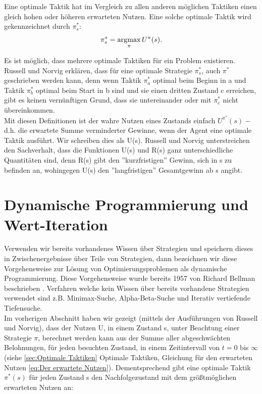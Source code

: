 Eine optimale Taktik hat im Vergleich zu allen anderen möglichen Taktiken einen gleich hohen oder höheren erwarteten Nutzen. Eine solche optimale Taktik wird gekennzeichnet durch $\pi^*_s$: \\ 

\begin{equation}
\pi^*_s = \operatorname*{arg\!\max}_\pi U^\pi(s).
\end{equation}

Es ist möglich, dass mehrere optimale Taktiken für ein Problem existieren. Russell und Norvig erklären, dass für eine optimale Strategie $\pi^*_s$, auch $\pi^*$ geschrieben werden kann, denn wenn Taktik $\pi^*_a$ optimal beim Beginn in a und Taktik $\pi^*_b$ optimal beim Start in b sind und sie einen dritten Zustand c erreichen, gibt es keinen vernünftigen Grund, dass sie untereinander oder mit $\pi^*_c$ nicht übereinkommen. \\

Mit diesen Definitionen ist der wahre Nutzen eines Zustands einfach $U^{\pi^*}(s) -$ d.h. die erwartete Summe verminderter Gewinne, wenn der Agent eine optimale Taktik ausführt. Wir schreiben dies als U(s). Russell und Norvig unterstreichen den Sachverhalt, dass die Funktionen U(s) und R(s) ganz unterschiedliche Quantitäten sind, denn R(s) gibt den ''kurzfristigen'' Gewinn, sich in s zu befinden an, wohingegen U(s) den ''langfristigen'' Gesamtgewinn ab s angibt.


\section{Dynamische Programmierung und Wert-Iteration}
Verwenden wir bereits vorhandenes Wissen über Strategien und speichern dieses in Zwischenergebnisse über Teile von Strategien, dann bezeichnen wir diese Vorgehensweise zur Lösung von Optimierungsproblemen als dynamische Programmierung. Diese Vorgehensweise wurde bereits 1957 von Richard Bellman beschrieben \cite[293]{Ertel}. Verfahren welche kein Wissen über bereits vorhandene Strategien verwendet sind z.B. Minimax-Suche, Alpha-Beta-Suche und Iterativ vertiefende Tiefensuche.\\

Im vorherigen Abschnitt haben wir gezeigt (mittels der Ausführungen von Russell und Norvig), dass der Nutzen U, in einem Zustand s, unter Beachtung einer Strategie $\pi$, berechnet werden kann aus der Summe aller abgeschwächten Belohnungen, für jeden besuchten Zustand, in einem Zeitintervall von $t = 0$ bis $\infty$ (siehe \ref{sec:Optimale Taktiken} Optimale Taktiken, Gleichung für den erwarteten Nutzen \ref{eq:Der erwartete Nutzen}). Dementsprechend gibt eine optimale Taktik $\pi^*(s)$ für jeden Zustand s den Nachfolgezustand mit dem größtmöglichen erwarteten Nutzen an:


